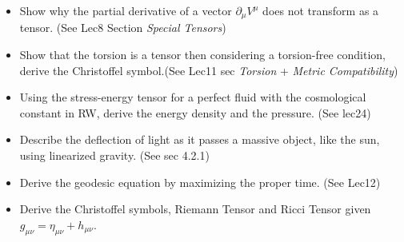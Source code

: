 \begin{itemize}
\item Show why the partial derivative of a vector $\partial_{\mu }V^{\mu }$ does not transform as a tensor. (See Lec8 Section \emph{Special Tensors})
\item Show that the torsion is a tensor then considering a torsion-free condition, derive the Christoffel symbol.(See Lec11 sec \emph{Torsion} + \emph{Metric Compatibility})
\item Using the stress-energy tensor for a perfect fluid with the cosmological constant in RW, derive the energy density and the pressure. (See lec24)
\item Describe the deflection of light as it passes a massive object, like the sun, using linearized gravity. (See sec 4.2.1)
\item Derive the geodesic equation by maximizing the proper time. (See Lec12)
\item Derive the Christoffel symbols, Riemann Tensor and Ricci Tensor given $g_{\mu \nu } = \eta_{\mu \nu } +h_{\mu \nu }$. 
\end{itemize}












